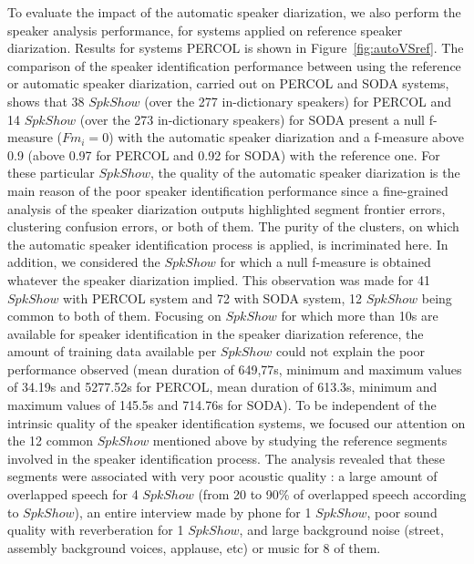 To evaluate the impact of the automatic speaker diarization, we also perform the speaker analysis performance, for systems applied on reference speaker diarization. Results for systems PERCOL is shown in Figure~\ref{fig:autoVSref}.  
The comparison of the speaker identification performance between using the reference or automatic speaker diarization, carried out on PERCOL and SODA systems, shows that 38 $SpkShow$ (over the 277 in-dictionary speakers) for PERCOL and 14 $SpkShow$ (over the 273 in-dictionary speakers) for SODA present a null f-measure ($Fm_i=0$) with the automatic speaker diarization and a f-measure above 0.9 (above 0.97 for PERCOL and 0.92 for SODA) with the reference one. For these particular $SpkShow$, the quality of the automatic speaker diarization is the main reason of the poor speaker identification performance since a fine-grained analysis of the speaker diarization outputs highlighted segment frontier errors, clustering confusion errors, or both of them. The purity of the clusters, on which the automatic speaker identification process is applied, is incriminated here. 
In addition, we considered the $SpkShow$ for which a null f-measure is obtained whatever the speaker diarization implied. This observation was made for 41 $SpkShow$ with PERCOL system and 72 with SODA system, 12 $SpkShow$ being common to both of them. Focusing on $SpkShow$ for which more than 10s are available for speaker identification in the speaker diarization reference, the amount of training data available per $SpkShow$  could not explain the poor performance observed (mean duration of 649,77s, minimum and maximum values of 34.19s and 5277.52s for PERCOL, mean duration of 613.3s, minimum and maximum values of 145.5s and 714.76s for SODA). 
To be independent of the intrinsic quality of the speaker identification systems, we focused our attention on the 12 common $SpkShow$ mentioned above by studying the reference segments involved in the speaker identification process. The analysis revealed that these segments were associated with very poor acoustic quality : a large amount of overlapped speech for 4 $SpkShow$ (from 20 to 90\% of overlapped speech according to  $SpkShow$), an entire interview made by phone for 1 $SpkShow$, poor sound quality with reverberation for 1 $SpkShow$, and large background noise (street, assembly background voices, applause, etc) or music for 8 of them.


